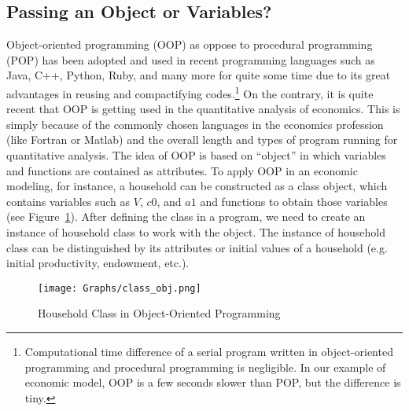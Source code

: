 \documentclass[12pt]{article}
\begin{document}
\subsection{Passing an Object or Variables?}
Object-oriented programming (OOP) as oppose to procedural programming (POP) has been adopted and used in recent programming languages such as Java, C++, Python, Ruby, and many more for quite some time due to its great advantages in reusing and compactifying codes.\footnote{\sf Computational time difference of a serial program written in object-oriented programming and procedural programming is negligible. In our example of economic model, OOP is a few seconds slower than POP, but the difference is tiny.} On the contrary, it is quite recent that OOP is getting used in the quantitative analysis of economics. This is simply because of the commonly chosen languages in the economics profession (like Fortran or Matlab) and the overall length and types of program running for quantitative analysis. The idea of OOP is based on ``object'' in which variables and functions are contained as attributes. To apply OOP in an economic modeling, for instance, a household can be constructed as a class object, which contains variables such as $V$, $c0$, and $a1$ and functions to obtain those variables (see Figure~\ref{fig:oop}). After defining the class in a program, we need to create an instance of household class to work with the object. The instance of household class can be distinguished by its attributes or initial values of a household (e.g. initial productivity, endowment, etc.).


\begin{figure}[t!]
\sf
\begin{center}
\caption{\sf Household Class in Object-Oriented Programming}
\texttt{[image: Graphs/class\_obj.png]}\label{fig:oop}
\end{center}
\end{figure}
\end{document}
